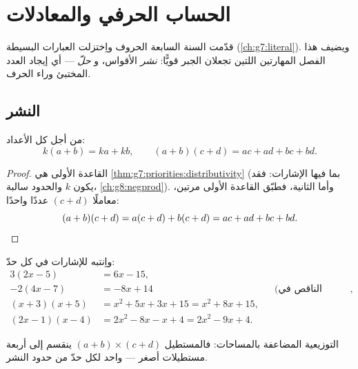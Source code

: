 \chapter{الحساب الحرفي والمعادلات}\label{ch:g8:equations}

قدّمت السنة السابعة الحروف واِختزلت العبارات البسيطة
(\cref{ch:g7:literal}). ويضيف هذا الفصل المهارتين اللتين تجعلان
الجبر قويًّا: \emph{نشر}  الأقواس، و
\emph{حلّ } --- أي إيجاد العدد المختبئ وراء
الحرف.

\section{النشر}

\begin{theorem}\label{thm:g8:equations:expand}
من أجل كل الأعداد:
\[
k(a + b) = ka + kb,
\qquad
(a + b)(c + d) = ac + ad + bc + bd .
\]
\end{theorem}

\begin{proof}
القاعدة الأولى هي \cref{thm:g7:priorities:distributivity} (بما فيها
الإشارات: فقد يكون $k$ والحدود سالبة،
\cref{ch:g8:negprod}). وأما الثانية، فطبّق القاعدة الأولى مرتين،
معاملًا $(c + d)$ عددًا واحدًا:
\[
(a + b)(c + d) = a(c + d) + b(c + d) = ac + ad + bc + bd .
\qedhere
\]
\end{proof}

\begin{example}\label{ex:g8:equations:expand}
واِنتبه للإشارات في كل حدّ:
\begin{align*}
3(2x - 5) &= 6x - 15, \\
-2(4x - 7) &= -8x + 14
&& \text{(الناقص في المقدمة يقلب الإشارتين)}, \\
(x + 3)(x + 5) &= x^2 + 5x + 3x + 15 = x^2 + 8x + 15, \\
(2x - 1)(x - 4) &= 2x^2 - 8x - x + 4 = 2x^2 - 9x + 4 .
\end{align*}
\end{example}

\begin{omfigure}

{\small التوزيعية المضاعفة بالمساحات: فالمستطيل
$(a+b) \times (c+d)$ ينقسم إلى أربعة مستطيلات أصغر --- واحد لكل
حدّ من حدود النشر.}
\end{omfigure}

